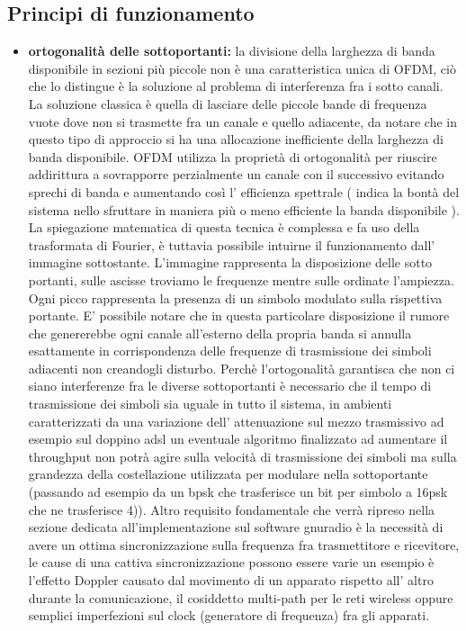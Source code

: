 \label{sec:problem}
\subsection{Principi di funzionamento}
\begin{itemize}
	 \item \textbf{ortogonalità delle sottoportanti: } la divisione della larghezza di banda disponibile in sezioni più piccole non è una caratteristica unica di OFDM, ciò che lo distingue è la soluzione al problema di interferenza fra i sotto canali. La soluzione classica è quella di lasciare delle piccole bande di frequenza vuote dove non si trasmette fra un canale e quello adiacente, da notare che in questo tipo di approccio si ha una allocazione inefficiente della larghezza di banda disponibile. OFDM utilizza la proprietà di ortogonalità per riuscire addirittura a sovrapporre perzialmente un canale con il successivo evitando sprechi di banda e aumentando così l' efficienza spettrale ( indica la bontà del sistema nello sfruttare in maniera più o meno efficiente la banda disponibile \cite{efficienzaSpettrale}).
	 La spiegazione matematica di questa tecnica è complessa e fa uso della trasformata di Fourier, è tuttavia possibile intuirne il funzionamento dall' immagine sottostante. L'immagine rappresenta la disposizione delle sotto portanti, sulle ascisse troviamo le frequenze mentre sulle ordinate l'ampiezza. Ogni picco rappresenta la presenza di un simbolo modulato sulla rispettiva portante. E' possibile notare che in questa particolare disposizione il rumore che genererebbe ogni canale all'esterno della propria banda si annulla esattamente in corrispondenza delle frequenze di trasmissione dei simboli adiacenti non creandogli disturbo. Perchè l'ortogonalità garantisca che non ci siano interferenze fra le diverse sottoportanti è necessario che il tempo di trasmissione dei simboli sia uguale in tutto il sistema, in ambienti caratterizzati da una variazione dell' attenuazione sul mezzo trasmissivo ad esempio sul doppino adsl un eventuale algoritmo finalizzato ad aumentare il throughput non potrà agire sulla velocità di trasmissione dei simboli ma sulla grandezza della costellazione utilizzata per modulare nella sottoportante (passando ad esempio da un bpsk che trasferisce un bit per simbolo a 16psk che ne trasferisce 4)). Altro requisito fondamentale che verrà ripreso nella sezione dedicata all'implementazione sul software gnuradio è la necessità di avere un ottima sincronizzazione sulla frequenza fra trasmettitore e ricevitore, le cause di una cattiva sincronizzazione possono essere varie un esempio è l'effetto Doppler causato dal movimento di un apparato rispetto all' altro durante la comunicazione, il cosiddetto multi-path per le reti wireless oppure semplici imperfezioni sul clock (generatore di frequenza) fra gli apparati.

\end{itemize}
